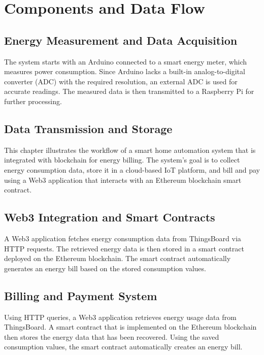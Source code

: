 \documentclass[a4paper,12pt]{report}
\begin{document}
\section{Components and Data Flow}

\subsection{Energy Measurement and Data Acquisition}

The system starts with an Arduino connected to a smart energy meter, which measures power consumption. Since Arduino lacks a built-in analog-to-digital converter (ADC) with the required resolution, an external ADC is used for accurate readings. The measured data is then transmitted to a Raspberry Pi for further processing.

\subsection{Data Transmission and Storage}

This chapter illustrates the workflow of a smart home automation system that is integrated with blockchain for energy billing.  The system's goal is to collect energy consumption data, store it in a cloud-based IoT platform, and bill and pay using a Web3 application that interacts with an Ethereum blockchain smart contract.

\subsection{Web3 Integration and Smart Contracts}

A Web3 application fetches energy consumption data from ThingsBoard via HTTP requests. The retrieved energy data is then stored in a smart contract deployed on the Ethereum blockchain. The smart contract automatically generates an energy bill based on the stored consumption values.

\subsection{Billing and Payment System}

Using HTTP queries, a Web3 application retrieves energy usage data from ThingsBoard.  A smart contract that is implemented on the Ethereum blockchain then stores the energy data that has been recovered.  Using the saved consumption values, the smart contract automatically creates an energy bill.
\end{document}
